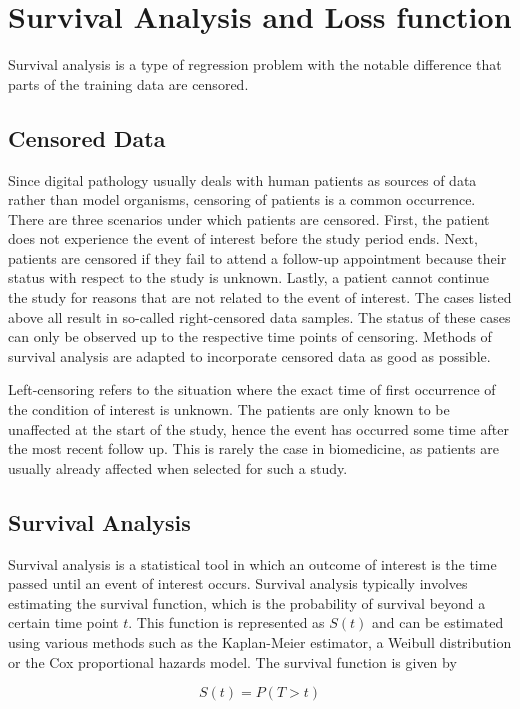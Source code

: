 \section{Survival Analysis and Loss function}
Survival analysis is a type of regression problem with the notable difference that parts of the training data are censored. 

\subsection{Censored Data}
Since digital pathology usually deals with human patients as sources of data rather than model organisms, censoring of patients is a common occurrence. There are three scenarios under which patients are censored. First, the patient does not experience the event of interest before the study period ends. Next, patients are censored if they fail to attend a follow-up appointment because their status with respect to the study is unknown. Lastly, a patient cannot continue the study for reasons that are not related to the event of interest.
The cases listed above all result in so-called right-censored data samples. The status of these cases can only be observed up to the respective time points of censoring. Methods of survival analysis are adapted to incorporate censored 
data as good as possible. \cite{Kleinbaum2012Cox}

Left-censoring refers to the situation where the exact time of first occurrence of the condition of interest is unknown. The patients are only known to be unaffected at the start of the study, hence the event has occurred some time after the most recent follow up. \cite{Kleinbaum2012Cox} This is rarely the case in biomedicine, as patients are usually already affected when selected for such a study.

\subsection{Survival Analysis}
Survival analysis is a statistical tool in which an outcome of interest is the time passed until an event of interest occurs. Survival analysis typically involves estimating the survival function, which is the probability of survival beyond a certain time point \(t\). This function is represented as \(S(t)\) and can be estimated using various methods such as the Kaplan-Meier estimator, a Weibull distribution or the Cox proportional hazards model. The survival function is given by

\[ S(t) = P(T>t) \]

